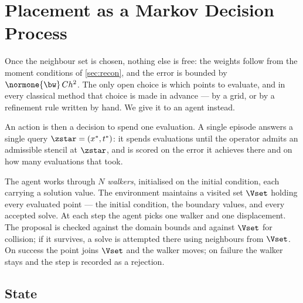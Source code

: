 
\section{Placement as a Markov Decision Process}
\label{sec:mdp}

Once the neighbour set is chosen, nothing else is free: the weights follow
from the moment conditions of \cref{sec:recon}, and the error is bounded by
$\normone{\bw}\, C h^2$. The only open choice is which points to evaluate,
and in every classical method that choice is made in advance --- by a grid,
or by a refinement rule written by hand. We give it to an agent instead.

An action is then a decision to spend one evaluation. A single episode
answers a single query $\zstar = (x^*, t^*)$: it spends evaluations until the
operator admits an admissible stencil at $\zstar$, and is scored on the error
it achieves there and on how many evaluations that took.

The agent works through $N$ \emph{walkers}, initialised on the initial
condition, each carrying a solution value. The environment maintains a
visited set $\Vset$ holding every evaluated point --- the initial condition,
the boundary values, and every accepted solve. At each step the agent picks
one walker and one displacement. The proposal is checked against the domain
bounds and against $\Vset$ for collision; if it survives, a solve is
attempted there using neighbours from $\Vset$. On success the point joins
$\Vset$ and the walker moves; on failure the walker stays and the step is
recorded as a rejection.

\subsection{State}
\label{sec:mdp_state}

